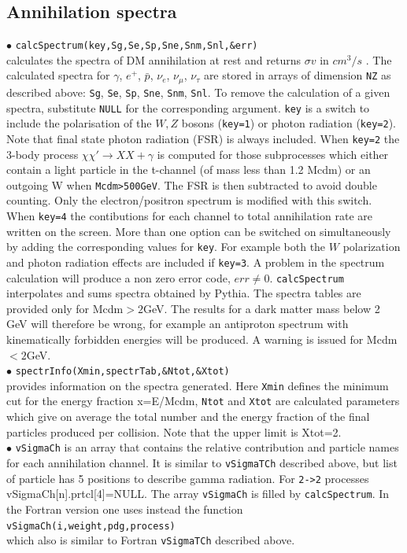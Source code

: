 \documentclass[12pt,a4paper]{article}
\begin{document}
\subsection{Annihilation spectra}
$\bullet$ \verb|calcSpectrum(key,Sg,Se,Sp,Sne,Snm,Snl,&err)|\\
calculates  the spectra  of DM annihilation 
at rest and returns $\sigma v$ in $cm^3/s$ . The calculated spectra
for $\gamma$, $e^+$, $\bar{p}$, $\nu_e$, $\nu_{\mu}$, $\nu_{\tau}$ 
are stored in arrays of dimension \verb|NZ| as described above: \verb|Sg|, \verb|Se|, \verb|Sp|, \verb|Sne|, \verb|Snm|, \verb|Snl|. 
 To remove the calculation of a given spectra, substitute  
\verb|NULL| for the corresponding argument. 
\verb|key| is a switch to include the polarisation of the  $W,Z$ bosons (\verb|key=1|) or
 photon radiation (\verb|key=2|).  
 Note that final state photon radiation (FSR) is always included.
When \verb|key=2| the 3-body  process $\chi\chi'\rightarrow XX +\gamma$ is computed for those subprocesses which either contain a light particle in the t-channel (of mass less than 1.2 Mcdm) or an outgoing W when \verb|Mcdm>500GeV|. The FSR is then subtracted to avoid double counting.
Only the electron/positron spectrum is modified with this switch.
When \verb|key=4| the contibutions  for each  channel to total
annihilation rate  are written on the screen. More than one option
can be switched on simultaneously by adding the corresponding values for \verb|key|. 
For example both the $W$ polarization and photon radiation effects  are included if
\verb|key=3|.
A problem in the spectrum calculation will produce a non zero error code, $err\neq
0$. {\tt calcSpectrum} interpolates and sums spectra obtained
by Pythia. The spectra tables are provided only for Mcdm$>2$GeV. The results for a dark matter
mass below 2 GeV will therefore be wrong, for example an antiproton
spectrum  with  kinematically forbidden energies will be produced. A warning is issued for Mcdm$<2$GeV. \\  
$\bullet$ \verb|spectrInfo(Xmin,spectrTab,&Ntot,&Xtot)|\\
provides information on the spectra generated. Here \verb|Xmin| defines the minimum 
cut for the energy fraction x=E/Mcdm, \verb|Ntot| and \verb|Xtot| are calculated parameters 
which give on average the total number and the energy fraction of the final particles 
produced per collision. Note that the upper limit is Xtot=2.\\
$\bullet$ \verb|vSigmaCh| is an array that contains the relative contribution and particle names for each
annihilation channel. It is similar to  {\tt vSigmaTCh}
described above, but list of particle has 5 positions to describe gamma
radiation. For \verb|2->2| processes vSigmaCh[n].prtcl[4]=NULL. The array {\tt vSigmaCh} is filled by 
{\tt calcSpectrum}. In the Fortran version one uses instead
the function\\
\noindent \verb|vSigmaCh(i,weight,pdg,process)|\\
which also is similar to Fortran  {\tt vSigmaTCh} described above.
\end{document}
